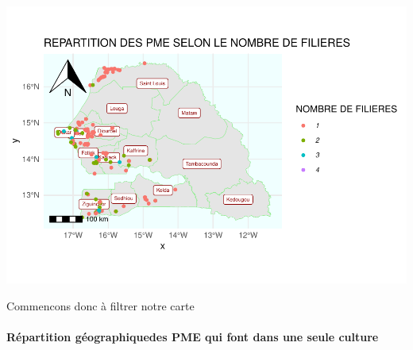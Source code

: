 \documentclass[
]{article}
\begin{document}
\begin{center}\includegraphics{Projet_R_ISE_1_files/figure-latex/unnamed-chunk-37-1} \end{center}

\hfill\break

Commencons donc à filtrer notre carte\\

\hypertarget{ruxe9partition-guxe9ographiquedes-pme-qui-font-dans-une-seule-culture}{%
\paragraph{Répartition géographiquedes PME qui font dans une seule
culture}\label{ruxe9partition-guxe9ographiquedes-pme-qui-font-dans-une-seule-culture}}

\hfill\break
\end{document}
